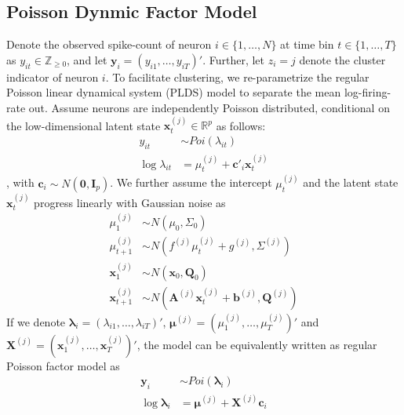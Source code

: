 \documentclass{article}
\begin{document}
	\subsection{Poisson Dynmic Factor Model}
	Denote the observed spike-count of neuron $i \in \{ 1,\ldots,N\}$ at
	time bin $t \in \{ 1,\ldots,T\}$ as
	$y_{it} \in \mathbb{Z}_{\geq 0}$, and let
	$\bm{y}_{i} =  (y_{i1},\ldots,y_{iT})'$.
	Further, let $z_{i} = j$ denote the cluster indicator of neuron $i$. To facilitate clustering, we re-parametrize the regular Poisson linear dynamical system (PLDS) model to separate the mean log-firing-rate out. Assume neurons are independently Poisson distributed, conditional on the
	low-dimensional latent state $\bm{x}_{t}^{(j)} \in \mathbb{R}^{p}$ as follows:
	\begin{align*}
		y_{it} &\sim Poi(\lambda_{it})\\
		\log\lambda_{it} &= \mu_t^{(j)} + \bm{c}'_i\bm{x}^{(j)}_t
	\end{align*}
	, with $\bm{c}_i\sim N(\bm{0},\bm{I}_p)$. We further assume the intercept $\mu_t^{(j)}$ and the latent state $\bm{x}^{(j)}_t$ progress linearly with Gaussian noise as
	\begin{align*}
		\mu_1^{(j)} &\sim N(\mu_0, \Sigma_0)\\
		\mu_{t+1}^{(j)} &\sim N(f^{(j)}\mu_t^{(j)} + g^{(j)}, \Sigma^{(j)})\\
		\bm{x}_1^{(j)} &\sim N(\bm{x}_0, \bm{Q}_0)\\
		\bm{x}_{t+1}^{(j)} &\sim N(\bm{A}^{(j)}\bm{x}_t^{(j)} + \bm{b}^{(j)}, \bm{Q}^{(j)})
	\end{align*}
	If we denote $\bm{\lambda}_{i} =  (\lambda_{i1},\ldots,\lambda_{iT})'$, $\bm{\mu}^{(j)} = (\mu^{(j)}_1,\ldots,\mu^{(j)}_T)'$ and $\bm{X}^{(j)} = (\bm{x}^{(j)}_1,\ldots,\bm{x}^{(j)}_T)'$, the model can be equivalently written as regular Poisson factor model as
	\begin{align*}
		\bm{y}_i &\sim Poi(\bm{\lambda}_i)\\
		\log\bm{\lambda}_i &= \bm{\mu}^{(j)}+ \bm{X}^{(j)}\bm{c}_i 
	\end{align*}
\end{document}
